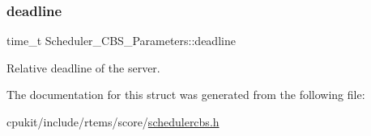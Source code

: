 \subsubsection{\texorpdfstring{deadline}{deadline}}
{\footnotesize\ttfamily time\+\_\+t Scheduler\+\_\+\+C\+B\+S\+\_\+\+Parameters\+::deadline}

Relative deadline of the server. 

The documentation for this struct was generated from the following file\+:\begin{DoxyCompactItemize}
\item 
cpukit/include/rtems/score/\mbox{\hyperlink{schedulercbs_8h}{schedulercbs.\+h}}\end{DoxyCompactItemize}
